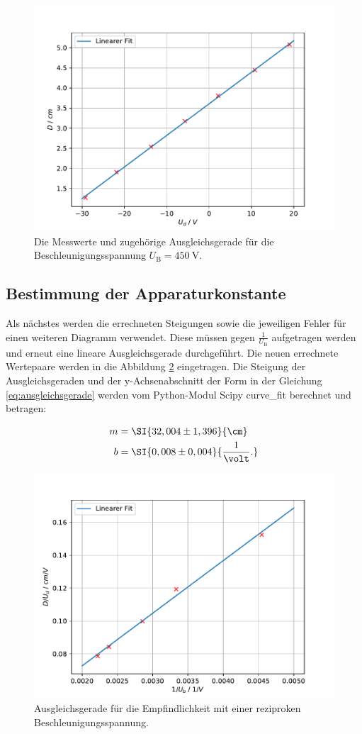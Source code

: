 \begin{figure}[h!]
	\centering
	\includegraphics[width=0.7\linewidth]{../../Leuchtpunktverschiebung5}
	\caption{Die Messwerte und zugehörige Ausgleichsgerade für die Beschleunigungsspannung $U_\text{B} = \SI{450}{\volt}$.}
	\label{fig:leuchtpunktverschiebung5}
\end{figure}


\subsection{Bestimmung der Apparaturkonstante}

Als nächstes werden die errechneten Steigungen sowie die jeweiligen Fehler für einen weiteren Diagramm verwendet. Diese müssen gegen $\frac{1}{U_\text{B}}$ aufgetragen werden und erneut eine lineare Ausgleichsgerade durchgeführt. Die neuen errechnete Wertepaare werden in die Abbildung \ref{fig:apparaturkonstante} eingetragen. Die Steigung der Ausgleichsgeraden und der y-Achsenabschnitt der Form in der Gleichung \ref{eq:ausgleichsgerade} werden vom Python-Modul Scipy curve\_fit berechnet und betragen:

\begin{align*}
m &= \SI{32,004 \pm 1,396}{\cm} \\
b &= \SI{0,008 \pm 0,004}{\frac{1}{\volt}.}
\end{align*}

\begin{figure}[h!]
	\centering
	\includegraphics[width=0.7\linewidth]{../../Apparaturkonstante}
	\caption{Ausgleichsgerade für die Empfindlichkeit mit einer reziproken Beschleunigungsspannung.}
	\label{fig:apparaturkonstante}
\end{figure}

